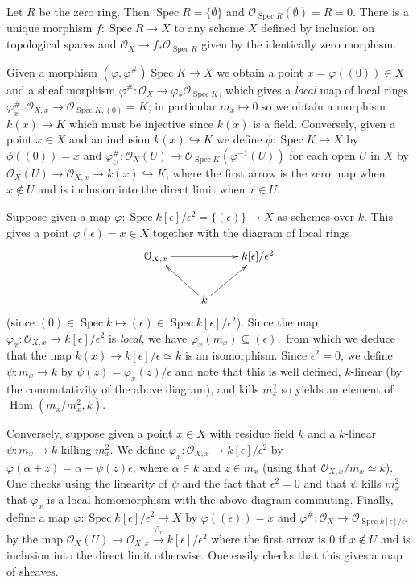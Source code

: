 \documentclass{report}
\renewcommand{\O}{\mathcal{O}}
\DeclareMathOperator{\Hom}{Hom}
\DeclareMathOperator{\Spec}{Spec}
\begin{document}
\bigskip
{} Let $R$ be the zero ring.  Then $\Spec R=\{\emptyset\}$ and $\O_{\Spec R}(\emptyset)=R=0$.  
There is a unique morphism $f:\Spec R\rightarrow X$ to any scheme $X$ defined by inclusion
on topological spaces and $\O_X\rightarrow f_*\O_{\Spec R}$ given by the identically zero morphism.

\bigskip
{}  Given a morphism $(\varphi,\varphi^{\#})\Spec K\rightarrow X$ we obtain 
a point $x=\varphi((0))\in X $ and a sheaf morphism $\varphi^{\#}:\O_X\rightarrow \varphi_*\O_{\Spec K}$,
which gives a {\em local} map of local rings $\varphi^{\#}_x:\O_{X,x}\rightarrow \O_{\Spec K,(0)}=K$;
in particular $m_x\mapsto 0$ so we obtain a morphism $k(x)\rightarrow K$ which must be injective since
$k(x)$ is a field.  Conversely, given a point $x\in X$ and an inclusion $k(x)\hookrightarrow K$
we define $\phi:\Spec K\rightarrow X$ by $\phi((0))=x$ and $\varphi^{\#}_U:\O_X(U)\rightarrow \O_{\Spec K}(\varphi^{-1}(U))$
for each open $U$ in $X$ by $\O_X(U)\rightarrow \O_{X,x}\rightarrow k(x)\hookrightarrow K$,
where the first arrow is the zero map when $x\not\in U$ and is inclusion into the direct limit
when $x\in U$.

\bigskip
{}	Suppose given a map $\varphi:\Spec k[\epsilon]/\epsilon^2=\{(\epsilon)\}\rightarrow X$ as schemes over $k$.
This gives a point $\varphi(\epsilon)=x\in X$ together with the diagram of local rings
\begin{equation}
\xymatrix{
	\O_{X,x} \ar[rr]& & k[\epsilon]/\epsilon^2 \\
		& \ar[ul] k \ar[ur] &  
}\nonumber
\end{equation}
(since $(0)\in\Spec k\mapsto (\epsilon)\in\Spec k[\epsilon]/\epsilon^2$).
Since the map $\varphi_x:\O_{X,x}\rightarrow k[\epsilon]/\epsilon^2$ is {\em local}, we have $\varphi_x(m_x)\subseteq (\epsilon),$
from which we deduce that the map $k(x)\rightarrow k[\epsilon]/\epsilon\simeq k$ is an isomorphism.
Since $\epsilon^2=0$, we define $\psi:m_x\rightarrow k$ by $\psi(z)=\varphi_x(z)/\epsilon$ and note that this is well defined,
 $k$-linear (by the commutativity of the above diagram), and kills $m_x^2$ so yields an element of $\Hom(m_x/m_x^2,k)$.
 
 Conversely, suppose given a point $x\in X$ with residue field $k$ and a $k$-linear $\psi:m_x\rightarrow k$ killing $m_x^2$.  We define
 $\varphi_x:\O_{X,x}\rightarrow k[\epsilon]/\epsilon^2$ by $\varphi(\alpha+z)=\alpha+\psi(z)\epsilon$, where $\alpha\in k$ and $z\in m_x$
 (using that $\O_{X,x}/m_x\simeq k$).  One checks using the linearity of $\psi$ and the fact that $\epsilon^2=0$ and that $\psi$ kills
 $m_x^2$ that $\varphi_x$ is a local homomorphism with the above diagram commuting.
 Finally, define a map $\varphi:\Spec k[\epsilon]/\epsilon^2\rightarrow X$ by 
 $\varphi((\epsilon))=x$ and $\varphi^{\#}:\O_{X}\rightarrow \O_{\Spec k[\epsilon]/\epsilon^2}$ by
 the map $\O_X(U)\rightarrow \O_{X,x}\xrightarrow{\varphi_x} k[\epsilon]/\epsilon^2$ where the first arrow
 is 0 if $x\not\in U$ and is inclusion into the direct limit otherwise.  One easily checks that this gives a map of
 sheaves.
\end{document}
